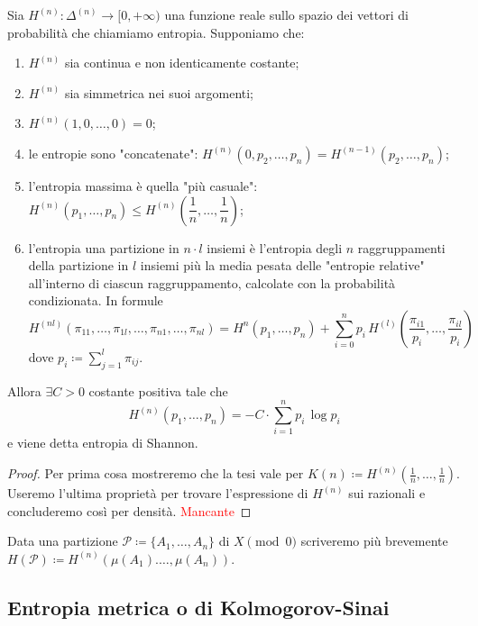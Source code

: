 \begin{thm}
    Sia $ H^{(n)} \colon \Delta^{(n)} \to [0, +\infty) $ una funzione reale sullo spazio dei vettori di probabilità che chiamiamo entropia. Supponiamo che:    \begin{enumerate}[label=(\roman*)]
        \item $ H^{(n)} $ sia continua e non identicamente costante;
        \item $ H^{(n)} $ sia simmetrica nei suoi argomenti;
        \item $ H^{(n)}(1, 0, \ldots, 0) = 0 $;
        \item le entropie sono "concatenate": $ H^{(n)}(0, p_2, \ldots, p_n) = H^{(n-1)}(p_2, \ldots, p_n) $;
        \item l'entropia massima è quella "più casuale": $ H^{(n)}(p_1, \ldots, p_n) \leq H^{(n)}\left(\dfrac{1}{n}, \ldots, \dfrac{1}{n}\right) $;
        \item l'entropia una partizione in $ n \cdot l $ insiemi è l'entropia degli $ n $ raggruppamenti della partizione in $ l $ insiemi più la media pesata delle "entropie relative" all'interno di ciascun raggruppamento, calcolate con la probabilità condizionata. In formule
        \[
            H^{(nl)}(\pi_{11}, \ldots, \pi_{1l}, \ldots, \pi_{n1}, \ldots, \pi_{nl}) = H^{n}(p_1, \ldots, p_n) + \sum_{i = 0}^{n} p_i \, H^{(l)} \left(\dfrac{\pi_{i1}}{p_i}, \ldots, \dfrac{\pi_{il}}{p_i}\right)
        \]
        dove $ p_i \coloneqq \sum_{j = 1}^{l} \pi_{ij} $.
    \end{enumerate}
    Allora $ \exists C > 0 $ costante positiva tale che
    \[
        H^{(n)}(p_1, \ldots, p_n) = -C \cdot \sum_{i = 1}^{n} p_i \, \log{p_i}
    \]
    e viene detta entropia di Shannon.
\end{thm}
\begin{proof}
    Per prima cosa mostreremo che la tesi vale per $ K(n) \coloneqq H^{(n)}\left(\frac{1}{n}, \ldots, \frac{1}{n}\right) $. Useremo l'ultima proprietà per trovare l'espressione di $ H^{(n)} $ sui razionali e concluderemo così per densità. \textcolor{red}{Mancante}
\end{proof}

Data una partizione $ \mathcal{P} \coloneqq \{A_1, \ldots, A_n\} $ di $ X \pmod{0} $ scriveremo più brevemente $ H(\mathcal{P}) \coloneqq H^{(n)}(\mu(A_1). \ldots, \mu(A_n)) $.

\subsection{Entropia metrica o di Kolmogorov-Sinai}


